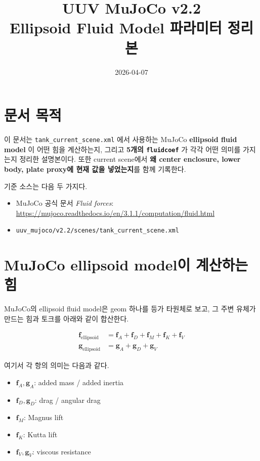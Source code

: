 \documentclass[11pt,a4paper]{article}
\title{UUV MuJoCo v2.2\\Ellipsoid Fluid Model 파라미터 정리본}
\author{}
\date{2026-04-07}
\newcommand{\code}[1]{\nolinkurl{#1}}
\begin{document}
\maketitle

\section{문서 목적}

이 문서는 \code{tank\_current\_scene.xml} 에서 사용하는 MuJoCo \textbf{ellipsoid fluid model} 이 어떤 힘을 계산하는지, 그리고 \textbf{5개의 \code{fluidcoef}} 가 각각 어떤 의미를 가지는지 정리한 설명본이다. 또한 current scene에서 \textbf{왜 center enclosure, lower body, plate proxy에 현재 값을 넣었는지}를 함께 기록한다.

기준 소스는 다음 두 가지다.
\begin{itemize}[leftmargin=2em]
  \item MuJoCo 공식 문서 \textit{Fluid forces}: \url{https://mujoco.readthedocs.io/en/3.1.1/computation/fluid.html}
  \item \code{uuv\_mujoco/v2.2/scenes/tank\_current\_scene.xml}
\end{itemize}

\section{MuJoCo ellipsoid model이 계산하는 힘}

MuJoCo의 ellipsoid fluid model은 geom 하나를 등가 타원체로 보고, 그 주변 유체가 만드는 힘과 토크를 아래와 같이 합산한다.

\begin{align*}
\mathbf{f}_{\text{ellipsoid}} &= \mathbf{f}_A + \mathbf{f}_D + \mathbf{f}_M + \mathbf{f}_K + \mathbf{f}_V \\
\mathbf{g}_{\text{ellipsoid}} &= \mathbf{g}_A + \mathbf{g}_D + \mathbf{g}_V
\end{align*}

여기서 각 항의 의미는 다음과 같다.
\begin{itemize}[leftmargin=2em]
  \item \(\mathbf{f}_A, \mathbf{g}_A\): added mass / added inertia
  \item \(\mathbf{f}_D, \mathbf{g}_D\): drag / angular drag
  \item \(\mathbf{f}_M\): Magnus lift
  \item \(\mathbf{f}_K\): Kutta lift
  \item \(\mathbf{f}_V, \mathbf{g}_V\): viscous resistance
\end{itemize}
\end{document}
